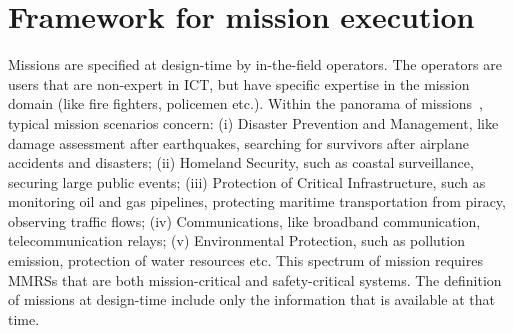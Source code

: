 \documentclass[journal]{IEEEtran}
\theoremstyle{definition}
\newcommand\patrizio[1]{\nb{Patrizio}{#1}}
\begin{document}









\section{Framework for mission execution}

Missions are specified at design-time by in-the-field operators. The operators are users that are non-expert in ICT, but have specific expertise in the mission domain (like  fire fighters, policemen etc.). Within the panorama of missions~\cite{skrzypietz2012unmanned}, typical mission scenarios concern: (i) Disaster Prevention and Management, like damage
assessment after earthquakes, searching for survivors after
airplane accidents and disasters; (ii) Homeland Security, such
as coastal surveillance, securing large public events; (iii) Protection
of Critical Infrastructure, such as monitoring oil and
gas pipelines, protecting maritime transportation from piracy,
observing traffic flows; (iv) Communications, like broadband
communication, telecommunication relays; (v) Environmental
Protection, such as pollution emission, protection of water
resources etc. 
This spectrum of mission requires 
MMRSs that are both mission-critical and safety-critical systems. The definition of missions at design-time include only the information that is available at that time. 
\end{document}

